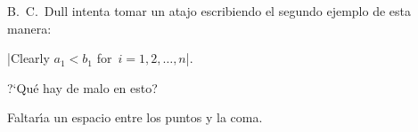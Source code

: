 

\bigskip

\enunciadoS B.~C.~Dull intenta tomar un atajo escribiendo el segundo
ejemplo de esta manera:

\medskip

|Clearly $a_1<b_1$ for~$i=1, 2, \ldots, n$|.

\medskip

\noindent?`Qu\'e hay de malo en esto?

\bigskip

\respuestaS Faltar\'{\i}a un espacio entre los puntos y la coma.

\bye

